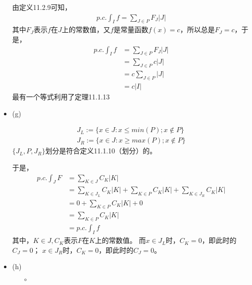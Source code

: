 \documentclass{article}
\begin{document}
\begin{itemize}
        由定义11.2.9可知，
        \begin{align*}
          p.c.\int_{I} f = \sum\limits_{J \in P} F_J |J|
        \end{align*}
        其中$F_J$表示$f$在$J$上的常数值，又$f$是常量函数$f(x) = c$，所以总是$F_J = c$，于是，
        \begin{align*}
          p.c.\int_{I} f & = \sum\limits_{J \in P} F_J |J| \\
                         & = \sum\limits_{J \in P} c |J|   \\
                         & = c\sum\limits_{J \in P} |J|    \\
                         & = c|I|
        \end{align*}
        最有一个等式利用了定理11.1.13


  \item (g)

        \begin{align*}
          J_L := \{x \in J: x \leq min(P) ; x \notin P \} \\
          J_R := \{x \in J: x \geq max(P) ; x \notin P \}
        \end{align*}
        $\{J_L, P, J_R\}$划分是符合定义11.1.10（划分）的。

        于是，
        \begin{align*}
          p.c.\int_{J} F & = \sum\limits_{K \in J} C_K |K|                                                                     \\
                         & = \sum\limits_{K \in J_L} C_K |K| + \sum\limits_{K \in P} C_K |K| + \sum\limits_{K \in J_R} C_K |K| \\
                         & = 0 + \sum\limits_{K \in P} C_K |K| + 0                                                             \\
                         & = \sum\limits_{K \in P} C_K |K|                                                                     \\
                         & = p.c.\int_{I} f
        \end{align*}
        其中，$K \in J, C_K$表示$F$在$K$上的常数值。
        而$x \in J_L$时，$C_K = 0$，即此时的$C_J = 0$；
        $x \in J_R$时，$C_K = 0$，即此时的$C_J = 0$。

  \item (h)

        \begin{itemize}
          \item[$\circ$]


\end{itemize}
\end{itemize}
\end{document}
